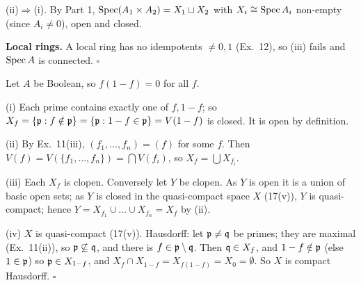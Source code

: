 \documentclass[11pt]{article}
\begin{document}
(ii)$\Rightarrow$(i). By Part 1, $\operatorname{Spec}(A_1\times A_2)=X_1\sqcup X_2$ with $X_i\cong\operatorname{Spec} A_i$ non-empty (since $A_i\ne0$), open and closed.

\textbf{Local rings.} A local ring has no idempotents $\neq0,1$ (Ex.~12), so (iii) fails and $\operatorname{Spec} A$ is connected. \hfill$\square$

\pf
Let $A$ be Boolean, so $f(1-f)=0$ for all $f$.

(i) Each prime contains exactly one of $f,1-f$; so $X_f=\{\mathfrak p:f\notin\mathfrak p\}=\{\mathfrak p:1-f\in\mathfrak p\}=V(1-f)$ is closed. It is open by definition.

(ii) By Ex.~11(iii), $(f_1,\dots,f_n)=(f)$ for some $f$. Then $V(f)=V(\{f_1,\dots,f_n\})=\bigcap V(f_i)$, so $X_f=\bigcup X_{f_i}$.

(iii) Each $X_f$ is clopen. Conversely let $Y$ be clopen. As $Y$ is open it is a union of basic open sets; as $Y$ is closed in the quasi-compact space $X$ (17(v)), $Y$ is quasi-compact; hence $Y=X_{f_1}\cup\dots\cup X_{f_n}=X_f$ by (ii).

(iv) $X$ is quasi-compact (17(v)). Hausdorff: let $\mathfrak p\ne\mathfrak q$ be primes; they are maximal (Ex.~11(ii)), so $\mathfrak p\not\subseteq\mathfrak q$, and there is $f\in\mathfrak p\setminus\mathfrak q$. Then $\mathfrak q\in X_f$, and $1-f\notin\mathfrak p$ (else $1\in\mathfrak p$) so $\mathfrak p\in X_{1-f}$, and $X_f\cap X_{1-f}=X_{f(1-f)}=X_0=\emptyset$. So $X$ is compact Hausdorff. \hfill$\square$
\end{document}
